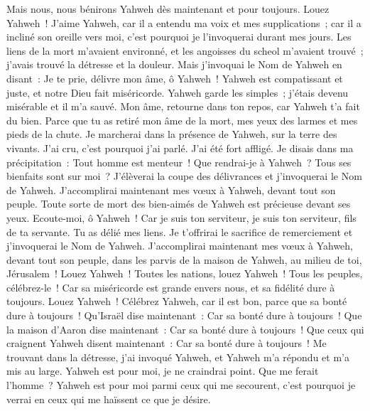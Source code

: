 \begin{multicols}{2}
Mais nous, nous bénirons Yahweh dès maintenant et pour toujours. Louez Yahweh~!
\VerseOne{}J'aime Yahweh, car il a entendu ma voix et mes supplications~;
car il a incliné son oreille vers moi, c'est pourquoi je l'invoquerai durant mes jours.
Les liens de la mort m'avaient environné, et les angoisses du scheol m'avaient trouvé~; j'avais trouvé la détresse et la douleur.
Mais j'invoquai le Nom de Yahweh en disant~: Je te prie, délivre mon âme, ô Yahweh~!
Yahweh est compatissant et juste, et notre Dieu fait miséricorde.
Yahweh garde les simples~; j'étais devenu misérable et il m'a sauvé.
Mon âme, retourne dans ton repos, car Yahweh t'a fait du bien.
Parce que tu as retiré mon âme de la mort, mes yeux des larmes et mes pieds de la chute.
Je marcherai dans la présence de Yahweh, sur la terre des vivants.
J'ai cru, c'est pourquoi j'ai parlé. J'ai été fort affligé.
Je disais dans ma précipitation~: Tout homme est menteur~!
Que rendrai-je à Yahweh~? Tous ses bienfaits sont sur moi~?
J'élèverai la coupe des délivrances et j'invoquerai le Nom de Yahweh.
J'accomplirai maintenant mes vœux à Yahweh, devant tout son peuple.
Toute sorte de mort des bien-aimés de Yahweh est précieuse devant ses yeux.
Ecoute-moi, ô Yahweh~! Car je suis ton serviteur, je suis ton serviteur, fils de ta servante. Tu as délié mes liens.
Je t'offrirai le sacrifice de remerciement et j'invoquerai le Nom de Yahweh.
J'accomplirai maintenant mes vœux à Yahweh, devant tout son peuple,
dans les parvis de la maison de Yahweh, au milieu de toi, Jérusalem~! Louez Yahweh~!
\VerseOne{}Toutes les nations, louez Yahweh~! Tous les peuples, célébrez-le~!
Car sa miséricorde est grande envers nous, et sa fidélité dure à toujours. Louez Yahweh~!
\VerseOne{}Célébrez Yahweh, car il est bon, parce que sa bonté dure à toujours~!
Qu'Israël dise maintenant~: Car sa bonté dure à toujours~!
Que la maison d'Aaron dise maintenant~: Car sa bonté dure à toujours~!
Que ceux qui craignent Yahweh disent maintenant~: Car sa bonté dure à toujours~!
Me trouvant dans la détresse, j'ai invoqué Yahweh, et Yahweh m'a répondu et m'a mis au large.
Yahweh est pour moi, je ne craindrai point. Que me ferait l'homme~?
Yahweh est pour moi parmi ceux qui me secourent, c'est pourquoi je verrai en ceux qui me haïssent ce que je désire.

\end{multicols}

